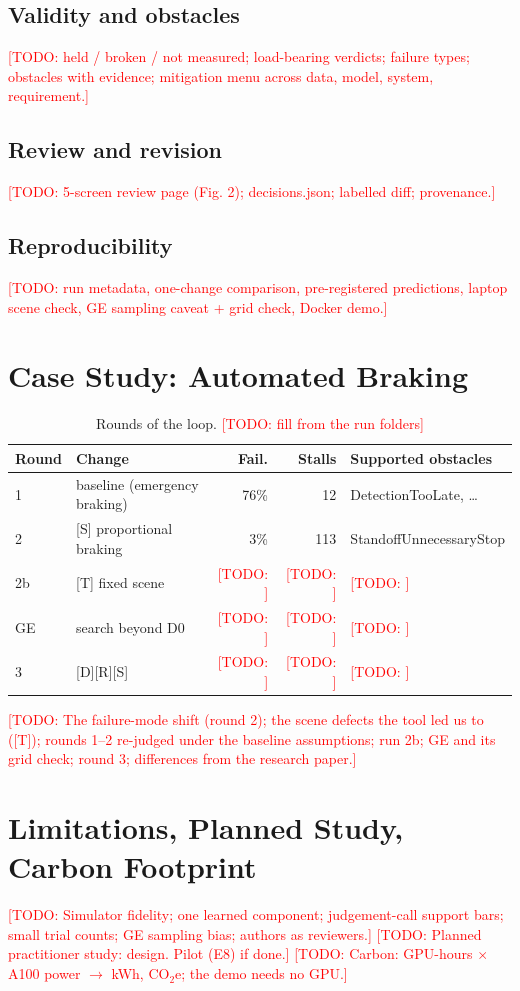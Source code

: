 \documentclass[10pt,conference]{IEEEtran}
\newcommand{\todo}[1]{\textcolor{red}{[TODO: #1]}}
\begin{document}
\subsection{Validity and obstacles}
\todo{held / broken / not measured; load-bearing verdicts; failure types;
obstacles with evidence; mitigation menu across data, model, system,
requirement.}
\subsection{Review and revision}
\todo{5-screen review page (Fig. 2); decisions.json; labelled diff; provenance.}
\subsection{Reproducibility}
\todo{run metadata, one-change comparison, pre-registered predictions,
laptop scene check, GE sampling caveat + grid check, Docker demo.}

\section{Case Study: Automated Braking}
\begin{table}[t]
\centering
\caption{Rounds of the loop. \todo{fill from the run folders}}
\label{tab:rounds}
\begin{tabular}{@{}llrrl@{}}
\toprule
Round & Change & Fail. & Stalls & Supported obstacles \\
\midrule
1 & baseline (emergency braking) & 76\% & 12 & DetectionTooLate, \ldots \\
2 & [S] proportional braking & 3\% & 113 & StandoffUnnecessaryStop \\
2b & [T] fixed scene & \todo{} & \todo{} & \todo{} \\
GE & search beyond D0 & \todo{} & \todo{} & \todo{} \\
3 & [D][R][S] & \todo{} & \todo{} & \todo{} \\
\bottomrule
\end{tabular}
\end{table}
\todo{The failure-mode shift (round 2); the scene defects the tool led us to
([T]); rounds 1--2 re-judged under the baseline assumptions; run 2b; GE and
its grid check; round 3; differences from the research paper.}

\section{Limitations, Planned Study, Carbon Footprint}
\todo{Simulator fidelity; one learned component; judgement-call support bars;
small trial counts; GE sampling bias; authors as reviewers.}
\todo{Planned practitioner study: design. Pilot (E8) if done.}
\todo{Carbon: GPU-hours $\times$ A100 power $\rightarrow$ kWh, CO$_2$e; the demo
needs no GPU.}
\end{document}
